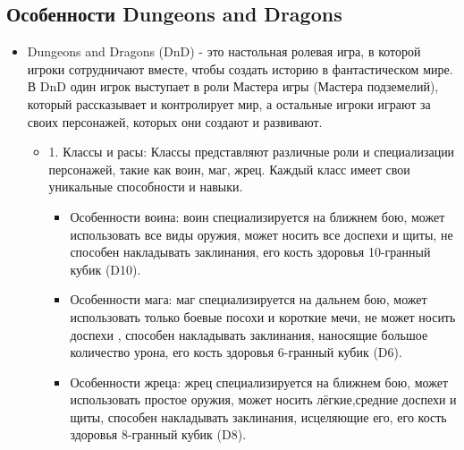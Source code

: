\subsection{Особенности Dungeons and Dragons}
\begin{itemize}
	\item Dungeons and Dragons (DnD) - это настольная ролевая игра, в которой игроки сотрудничают вместе, чтобы создать историю в фантастическом мире. В DnD один игрок выступает в роли Мастера игры (Мастера подземелий), который рассказывает и контролирует мир, а остальные игроки играют за своих персонажей, которых они создают и развивают.
	\begin{itemize} Основные элементы ролевой системы DnD включают:
		\item 1. Классы и расы: Классы представляют различные роли и специализации персонажей, такие как воин, маг, жрец. Каждый класс имеет свои уникальные способности и навыки.
			\begin{itemize}
				\item Особенности воина: воин специализируется на ближнем бою, может использовать все виды оружия, может носить все доспехи и щиты, не способен накладывать заклинания, его кость здоровья 10-гранный кубик (D10).
				\item Особенности мага: маг специализируется на дальнем бою, может использовать только боевые посохи и короткие мечи, не может носить доспехи , способен накладывать заклинания, наносящие большое количество урона, его кость здоровья 6-гранный кубик (D6).
				\item Особенности жреца: жрец специализируется на ближнем бою, может использовать простое оружия, может носить лёгкие,средние доспехи и щиты, способен накладывать заклинания, исцеляющие его, его кость здоровья 8-гранный кубик (D8).
			\end{itemize}


\end{itemize}
\end{itemize}
